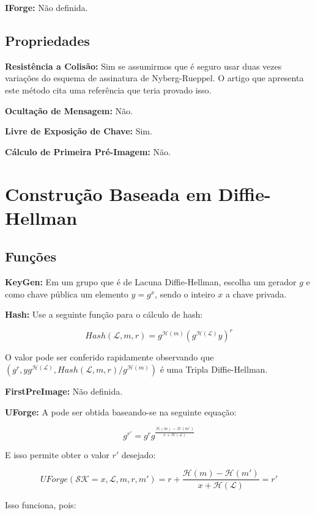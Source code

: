\documentclass[a4paper]{article}
\begin{document}
\textbf{IForge: }Não definida.

\subsection{Propriedades}

\textbf{Resistência a Colisão: }Sim se assumirmos que é seguro usar
duas vezes variações do esquema de assinatura de Nyberg-Rueppel. O
artigo que apresenta este método cita uma referência que teria provado
isso.

\textbf{Ocultação de Mensagem: }Não.

\textbf{Livre de Exposição de Chave: }Sim.

\textbf{Cálculo de Primeira Pré-Imagem: }Não.

\section{Construção Baseada em Diffie-Hellman \cite{ateniese}}

\subsection{Funções}

\textbf{KeyGen: }Em um grupo que é de Lacuna Diffie-Hellman, escolha
um gerador $g$ e como chave pública um elemento $y=g^x$, sendo o
inteiro $x$ a chave privada.

\textbf{Hash: }Use a seguinte função para o cálculo de hash:

$$
Hash(\mathcal{L}, m, r) = g^{\mathcal{H}(m)}(g^{\mathcal{H}(\mathcal{L})}y)^r
$$

O valor pode ser conferido rapidamente observando que $(g^r,
yg^{\mathcal{H}(\mathcal{L})}, Hash(\mathcal{L}, m,
r)/g^{\mathcal{H}(m)})$ é uma Tripla Diffie-Hellman.

\textbf{FirstPreImage:} Não definida.

\textbf{UForge:} A pode ser obtida baseando-se na seguinte equação:

$$
g^{r'}=g^rg^{\frac{\mathcal{H}(m)-\mathcal{H}(m')}{x+\mathcal{H}(\mathcal{L})}}
$$

E isso permite obter o valor $r'$ desejado:

$$
UForge(\mathcal{SK}=x, \mathcal{L}, m, r, m') = r + \frac{\mathcal{H}(m)-\mathcal{H}(m')}{x+\mathcal{H}(\mathcal{L})} = r'
$$

Isso funciona, pois:
\end{document}

